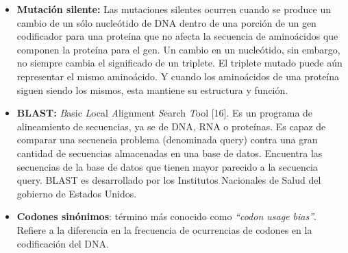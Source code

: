 \begin{itemize}
	\item \textbf{Mutación silente:} Las mutaciones silentes ocurren cuando se produce un cambio de un sólo nucleótido de DNA dentro de una porción de un 										gen codificador para una proteína que no afecta la secuencia de aminoácidos que componen la proteína para el gen. Un 										cambio en un nucleótido, sin embargo, no siempre cambia el significado de un triplete. El triplete mutado puede aún 									representar el mismo aminoácido. Y cuando los aminoácidos de una proteína siguen siendo los mismos, esta mantiene su 										estructura y función.				
	\item \textbf{BLAST:} \textit{B}asic \textit{L}ocal \textit{A}lignment \textit{S}earch \textit{T}ool [16]. Es un programa de alineamiento de 										secuencias, ya se de DNA, RNA o proteínas. Es capaz de comparar una secuencia problema (denominada query) contra una 										gran cantidad de secuencias almacenadas en una base de datos. Encuentra las secuencias de la base de datos que tienen 										mayor parecido a la secuencia query. BLAST es desarrollado por los Institutos Nacionales de Salud del gobierno de 										Estados Unidos.
	\item \textbf{Codones sinónimos}: término más conocido como \textit{``codon usage bias''}. Refiere a la diferencia en la frecuencia de ocurrencias de 										  codones en la codificación del DNA.
\end{itemize}
